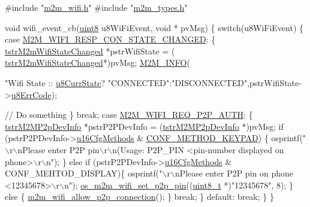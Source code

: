 \begin{DoxyCode}
\textcolor{preprocessor}{#include "\hyperlink{m2m__wifi_8h}{m2m\_wifi.h}"}
\textcolor{preprocessor}{#include "\hyperlink{m2m__types_8h}{m2m\_types.h}"}

\textcolor{keywordtype}{void} wifi\_event\_cb(\hyperlink{group__DataT_ga4df709a77647e870bbf1d955b8edc9a6}{uint8} u8WiFiEvent, \textcolor{keywordtype}{void} * pvMsg)
\{
    \textcolor{keywordflow}{switch}(u8WiFiEvent)
    \{
    \textcolor{keywordflow}{case} \hyperlink{group__WlanEnums_gga064de09dec1d5e88ed8d075fa40f57deabb42b3025c56c51d915a1fa4abd2dbd0}{M2M\_WIFI\_RESP\_CON\_STATE\_CHANGED}:
        \{
            \hyperlink{structtstrM2mWifiStateChanged}{tstrM2mWifiStateChanged} *pstrWifiState = (
      \hyperlink{structtstrM2mWifiStateChanged}{tstrM2mWifiStateChanged}*)pvMsg;
            \hyperlink{nm__common_8h_a84108eca2655e811179386a39c62acf2}{M2M\_INFO}(\textcolor{stringliteral}{"Wifi State :: %
      \hyperlink{structtstrM2mWifiStateChanged_a8cf6acc2d9640b20629c6b8383534dfa}{u8CurrState}? \textcolor{stringliteral}{"CONNECTED"}:\textcolor{stringliteral}{"DISCONNECTED"},pstrWifiState->\hyperlink{structtstrM2mWifiStateChanged_a6eec99c8a4c5c0c0db084dfe571507eb}{u8ErrCode});
            
            \textcolor{comment}{// Do something}
        \}
        \textcolor{keywordflow}{break};
    \textcolor{keywordflow}{case} \hyperlink{group__WlanEnums_gga064de09dec1d5e88ed8d075fa40f57dea4e202c60cd4154e5c0c247e0fa8c990f}{M2M\_WIFI\_REQ\_P2P\_AUTH}:
    \{
        \hyperlink{structtstrM2MP2pDevInfo}{tstrM2MP2pDevInfo} *pstrP2PDevInfo = (\hyperlink{structtstrM2MP2pDevInfo}{tstrM2MP2pDevInfo} *)pvMsg;
        \textcolor{keywordflow}{if} (pstrP2PDevInfo->\hyperlink{structtstrM2MP2pDevInfo_a3b622ee5784fce40ab909b791d648535}{u16CfgMethods} & \hyperlink{group__WlanDefines_gad704d19b15d73ed94b3fd1d6680d64fd}{CONF\_METHOD\_KEYPAD}) \{
            osprintf(\textcolor{stringliteral}{"\(\backslash\)r\(\backslash\)nPlease enter P2P pin\(\backslash\)r\(\backslash\)n(Usage: P2P\_PIN <pin-number displayed on phone>\(\backslash\)r\(\backslash\)n"});
        \}
        \textcolor{keywordflow}{else} \textcolor{keywordflow}{if} (pstrP2PDevInfo->\hyperlink{structtstrM2MP2pDevInfo_a3b622ee5784fce40ab909b791d648535}{u16CfgMethods} & CONF\_MEHTOD\_DISPLAY)\{
            osprintf(\textcolor{stringliteral}{"\(\backslash\)r\(\backslash\)nPlease enter P2P pin on phone <12345678>\(\backslash\)r\(\backslash\)n"});
                \hyperlink{m2m__wifi__ex_8h_a1c41efeb5037d1e0cc6b72dfe45a914c}{os\_m2m\_wifi\_set\_p2p\_pin}((\hyperlink{stdint_8h_aba7bc1797add20fe3efdf37ced1182c5}{uint8\_t} *)\textcolor{stringliteral}{"12345678"}, 8);
        \}
        \textcolor{keywordflow}{else} \{
            \hyperlink{m2m__wifi_8h_a25d63ac165f19310f6ed73d115ad9155}{m2m\_wifi\_allow\_p2p\_connection}();
        \}
        \textcolor{keywordflow}{break};
    \}
    \textcolor{keywordflow}{default}:
        \textcolor{keywordflow}{break};
    \}
\}

}
\end{DoxyCode}
